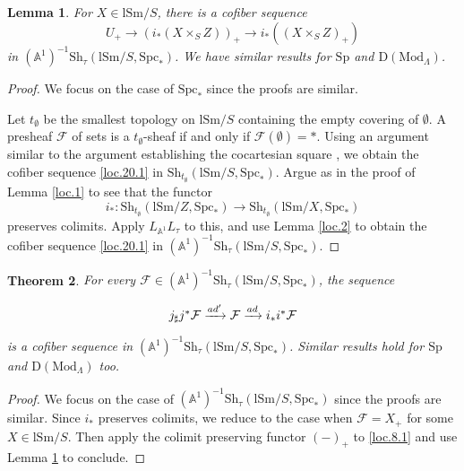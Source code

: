 \documentclass[10pt]{amsart}
\newtheorem{thm}{Theorem}[subsection]
\newtheorem{lem}[thm]{Lemma}
\theoremstyle{definition}
\theoremstyle{remark}
\numberwithin{equation}{subsection}
\newcommand{\A}{\mathbb{A}}
\newcommand{\cF}{\mathcal{F}}
\newcommand{\Spt}{\mathrm{Sp}}
\newcommand{\DLambda}{\mathrm{D}(\mathrm{Mod}_{\Lambda})}
\newcommand{\lSm}{\mathrm{lSm}}
\newcommand{\infShv}{\mathrm{Sh}}
\newcommand{\Spc}{\mathrm{Spc}}
\begin{document}
\begin{lem}
\label{loc.20}
For $X\in \lSm/S$, there is a cofiber sequence
\begin{equation}
\label{loc.20.1}
U_+
\to
(i_*(X\times_S Z))_+
\to
i_*((X\times_S Z)_+)
\end{equation}
in $(\A^1)^{-1}\infShv_{\tau}(\lSm/S,\Spc_*)$.
We have similar results for $\Spt$ and $\DLambda$.
\end{lem}
\begin{proof}
We focus on the case of $\Spc_*$ since the proofs are similar.

Let $t_\emptyset$ be the smallest topology on $\lSm/S$ containing the empty covering of $\emptyset$.
A presheaf $\cF$ of sets is a $t_\emptyset$-sheaf if and only if $\cF(\emptyset)=*$.
Using an argument similar to the argument establishing the cocartesian square \cite[(152)]{Ayo072},
we obtain the cofiber sequence \eqref{loc.20.1} in $\infShv_{t_\emptyset}(\lSm/S,\Spc_*)$.
Argue as in the proof of Lemma \ref{loc.1} to see that the functor
\[
i_*\colon \infShv_{t_\emptyset}(\lSm/Z,\Spc_*)\to \infShv_{t_\emptyset}(\lSm/X,\Spc_*)
\]
preserves colimits.
Apply $L_{\A^1}L_{\tau}$ to this, and use Lemma \ref{loc.2} to obtain the cofiber sequence \eqref{loc.20.1} in $(\A^1)^{-1}\infShv_{\tau}(\lSm/S,\Spc_*)$.
\end{proof}


\begin{thm}
\label{loc.17}
For every $\cF\in (\A^1)^{-1}\infShv_{\tau}(\lSm/S,\Spc_*)$, the sequence
\begin{equation}
\label{loc.17.1}
\begin{tikzcd}
j_\sharp j^* \cF
\xrightarrow{ad'}
\cF
\xrightarrow{ad}
i_*i^*\cF
\end{tikzcd}
\end{equation}
is a cofiber sequence in $(\A^1)^{-1}\infShv_{\tau}(\lSm/S,\Spc_*)$.
Similar results hold for $\Spt$ and $\DLambda$ too.
\end{thm}
\begin{proof}
We focus on the case of $(\A^1)^{-1}\infShv_{\tau}(\lSm/S,\Spc_*)$ since the proofs are similar.
Since $i_*$ preserves colimits,
we reduce to the case when $\cF=X_+$ for some $X\in \lSm/S$.
Then apply the colimit preserving functor $(-)_+$ to \eqref{loc.8.1} and use Lemma \ref{loc.20} to conclude.
\end{proof}
\end{document}
